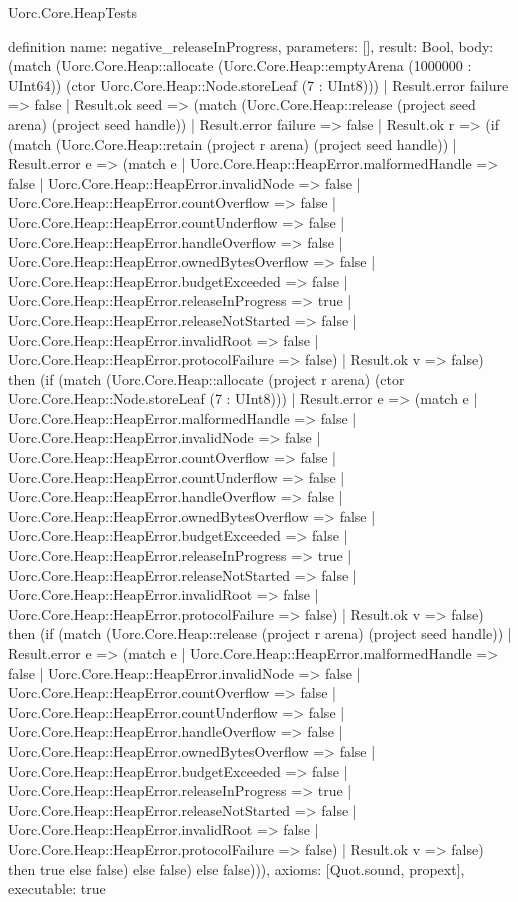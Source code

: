 \begin{lexlean}{Uorc.Core.HeapTests}
\begin{semanticmodule}
definition{
  name: negative_releaseInProgress,
  parameters: [],
  result: Bool,
  body: (match (Uorc.Core.Heap::allocate (Uorc.Core.Heap::emptyArena (1000000 : UInt64)) (ctor Uorc.Core.Heap::Node.storeLeaf (7 : UInt8)))
    | Result.error failure => false
    | Result.ok seed => (match (Uorc.Core.Heap::release (project seed arena) (project seed handle))
      | Result.error failure => false
      | Result.ok r => (if (match (Uorc.Core.Heap::retain (project r arena) (project seed handle))
        | Result.error e => (match e
          | Uorc.Core.Heap::HeapError.malformedHandle => false
          | Uorc.Core.Heap::HeapError.invalidNode => false
          | Uorc.Core.Heap::HeapError.countOverflow => false
          | Uorc.Core.Heap::HeapError.countUnderflow => false
          | Uorc.Core.Heap::HeapError.handleOverflow => false
          | Uorc.Core.Heap::HeapError.ownedBytesOverflow => false
          | Uorc.Core.Heap::HeapError.budgetExceeded => false
          | Uorc.Core.Heap::HeapError.releaseInProgress => true
          | Uorc.Core.Heap::HeapError.releaseNotStarted => false
          | Uorc.Core.Heap::HeapError.invalidRoot => false
          | Uorc.Core.Heap::HeapError.protocolFailure => false)
        | Result.ok v => false) then (if (match (Uorc.Core.Heap::allocate (project r arena) (ctor Uorc.Core.Heap::Node.storeLeaf (7 : UInt8)))
        | Result.error e => (match e
          | Uorc.Core.Heap::HeapError.malformedHandle => false
          | Uorc.Core.Heap::HeapError.invalidNode => false
          | Uorc.Core.Heap::HeapError.countOverflow => false
          | Uorc.Core.Heap::HeapError.countUnderflow => false
          | Uorc.Core.Heap::HeapError.handleOverflow => false
          | Uorc.Core.Heap::HeapError.ownedBytesOverflow => false
          | Uorc.Core.Heap::HeapError.budgetExceeded => false
          | Uorc.Core.Heap::HeapError.releaseInProgress => true
          | Uorc.Core.Heap::HeapError.releaseNotStarted => false
          | Uorc.Core.Heap::HeapError.invalidRoot => false
          | Uorc.Core.Heap::HeapError.protocolFailure => false)
        | Result.ok v => false) then (if (match (Uorc.Core.Heap::release (project r arena) (project seed handle))
        | Result.error e => (match e
          | Uorc.Core.Heap::HeapError.malformedHandle => false
          | Uorc.Core.Heap::HeapError.invalidNode => false
          | Uorc.Core.Heap::HeapError.countOverflow => false
          | Uorc.Core.Heap::HeapError.countUnderflow => false
          | Uorc.Core.Heap::HeapError.handleOverflow => false
          | Uorc.Core.Heap::HeapError.ownedBytesOverflow => false
          | Uorc.Core.Heap::HeapError.budgetExceeded => false
          | Uorc.Core.Heap::HeapError.releaseInProgress => true
          | Uorc.Core.Heap::HeapError.releaseNotStarted => false
          | Uorc.Core.Heap::HeapError.invalidRoot => false
          | Uorc.Core.Heap::HeapError.protocolFailure => false)
        | Result.ok v => false) then true else false) else false) else false))),
  axioms: [Quot.sound, propext],
  executable: true
}


\end{semanticmodule}
\end{lexlean}
